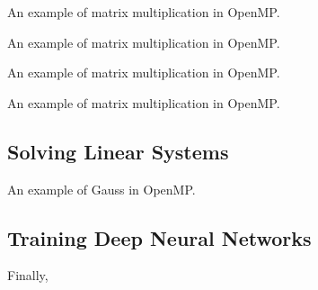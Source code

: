 \begin{codebox}[breakable]{}
\footnotesize An example of matrix multiplication in OpenMP.
\tcblower
{}
\end{codebox}

\begin{codebox}[breakable]{}
\footnotesize An example of matrix multiplication in OpenMP.
\tcblower
{}
\end{codebox}

\begin{codebox}[breakable]{}
\footnotesize An example of matrix multiplication in OpenMP.
\tcblower
{}
\end{codebox}

\begin{codebox}[breakable]{}
\footnotesize An example of matrix multiplication in OpenMP.
\tcblower
{}
\end{codebox}

\subsection{Solving Linear Systems}

\begin{codebox}[breakable]{}
\footnotesize An example of Gauss in OpenMP.
\tcblower
{}
\end{codebox}

\subsection{Training Deep Neural Networks}

Finally, 